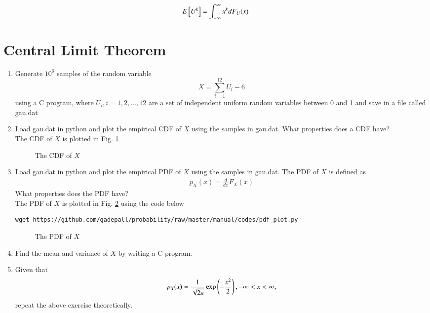 \documentclass[journal,12pt,twocolumn]{IEEEtran}
\renewcommand\thesection{\arabic{section}}
\begin{document}
%
\begin{equation}
    E{}\left[U^k\right] = \int_{-\infty}^{\infty}x^kdF_{U}(x)
\end{equation}
\section{Central Limit Theorem}
%
\begin{enumerate}[label=\thesection.\arabic*
        ,ref=\thesection.\theenumi]

    \item
          Generate $10^6$ samples of the random variable
          \begin{equation}
              X = \sum_{i=1}^{12}U_i -6
          \end{equation}
          using a C program, where $U_i, i = 1,2,\dots, 12$ are  a set of independent uniform random variables between 0 and 1
          and save in a file called gau.dat

    \item
          Load gau.dat in python and plot the empirical CDF of $X$ using the samples in gau.dat. What properties does a CDF have?
          \\
          \solution The CDF of $X$ is plotted in Fig. \ref{fig:gauss_cdf}
          \begin{figure}
              \centering
              \caption{The CDF of $X$}
              \label{fig:gauss_cdf}
          \end{figure}
    \item
          Load gau.dat in python and plot the empirical PDF of $X$ using the samples in gau.dat. The PDF of $X$ is defined as
          \begin{align}
              p_{X}(x) = \frac{d}{dx}F_{X}(x)
          \end{align}
          What properties does the PDF have?
          \\
          \solution The PDF of $X$ is plotted in Fig. \ref{fig:gauss_pdf} using the code below
          \begin{lstlisting}
wget https://github.com/gadepall/probability/raw/master/manual/codes/pdf_plot.py
\end{lstlisting}

          \begin{figure}
              \centering
              \caption{The PDF of $X$}
              \label{fig:gauss_pdf}
          \end{figure}

    \item Find the mean and variance of $X$ by writing a C program.
    \item Given that
          \begin{align}
              p_{X}(x) = \frac{1}{\sqrt{2\pi}}\exp\left(-\frac{x^2}{2}\right), -\infty < x < \infty,
          \end{align}
          repeat the above exercise theoretically.
\end{enumerate}
\end{document}
